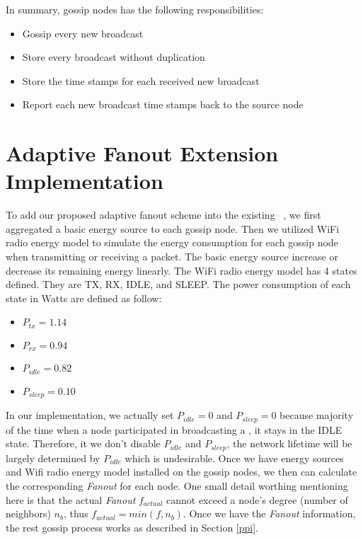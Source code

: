 In summary, gossip nodes has the following responsibilities:
\begin{itemize}
	\item Gossip every new broadcast \msg
	\item Store every broadcast \msg without duplication
	\item Store the time stamps for each received new broadcast \msg
	\item Report each new broadcast \msg time stamps back to the source node
\end{itemize}

\section{Adaptive Fanout Extension Implementation}

To add our proposed adaptive fanout scheme into the existing \pp ~\gp, we first aggregated a basic energy source to each gossip node. Then we utilized WiFi radio energy model to simulate the energy consumption for each gossip node when transmitting or receiving a packet. The basic energy source increase or decrease its remaining energy linearly. The WiFi radio energy model has 4 states defined. They are TX, RX, IDLE, and SLEEP. The power consumption of each state in Watts are defined as follow:

\begin{itemize}
	\item $P_{tx}=1.14$
	\item $P_{rx}=0.94$
	\item $P_{idle}=0.82$
	\item $P_{sleep}=0.10$
\end{itemize}

In our implementation, we actually set $P_{idle}=0$ and $P_{sleep}=0$ because majority of the time when a node participated in broadcasting a \msg, it stays in the IDLE state. Therefore, it we don't disable $P_{idle}$ and $P_{sleep}$, the network lifetime will be largely determined by $P_{idle}$ which is undesirable. Once we have energy sources and Wifi radio energy model installed on the gossip nodes, we then can calculate the corresponding \emph{Fanout} for each node. One small detail worthing mentioning here is that the actual \emph{Fanout} $f_{actual}$ cannot exceed a node's degree (number of neighbors) $n_b$, thus $f_{actual} = min(f, n_b)$. Once we have the \emph{Fanout} information, the rest gossip process works as described in Section \ref{ppi}.

